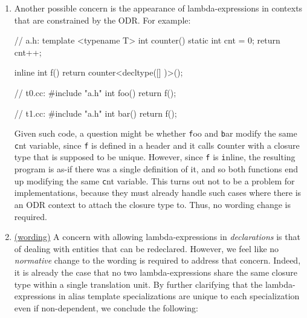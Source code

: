 \documentclass{wg21}
\newcommand{\cc}[1]{\texttt{#1}}
\begin{document}
\begin{enumerate}
    Thus, a function template declaration such as the following will require the
    implementation to make the lambda-expression part of the signature, which is
    specifically what we would like to avoid:
\begin{cpp}
template <unsigned N>
void f(const char (*s)[([]() { return N; })()]) { }
\end{cpp}

    To make sure this does not happen, we propose \hyperref[wording.template]
    {amending \textbf{[temp.over.link]}}.


  \item \label{discussion.ODR}
    Another possible concern is the appearance of lambda-expressions in
    contexts that are constrained by the ODR. For example:

\begin{cpp}
// a.h:
template <typename T>
int counter() {
  static int cnt = 0;
  return cnt++;
}

inline int f() {
  return counter<decltype([] {})>();
}

// t0.cc:
#include "a.h"
int foo() { return f(); }

// t1.cc:
#include "a.h"
int bar() { return f(); }
\end{cpp}

    Given such code, a question might be whether \cc foo and \cc bar modify
    the same \cc cnt variable, since \cc f is defined in a header and it calls
    \cc counter with a closure type that is supposed to be unique. However,
    since \cc f is \cc inline, the resulting program is as-if there was a
    single definition of it, and so both functions end up modifying the same
    \cc cnt variable. This turns out not to be a problem for implementations,
    because they must already handle such cases where there is an ODR context
    to attach the closure type to. Thus, no wording change is required.


  \item \label{discussion.redeclarations}
    \hyperref[wording.redeclarations]{(wording)}
    A concern with allowing lambda-expressions in \textit{declarations} is
    that of dealing with entities that can be redeclared. However, we feel like
    no \textit{normative} change to the wording is required to address that concern.
    Indeed, it is already the case that no two lambda-expressions share the same
    closure type within a single translation unit. By further clarifying that the
    lambda-expressions in alias template specializations are unique to each
    specialization even if non-dependent, we conclude the following:


\end{enumerate}
\end{document}
